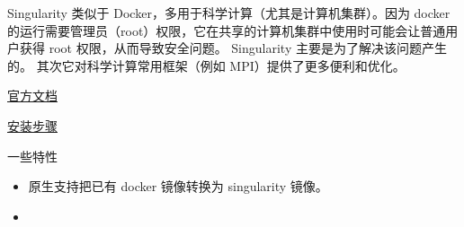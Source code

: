 
\begin{issues}
\issueDraft
\end{issues}

Singularity 类似于 Docker，多用于科学计算（尤其是计算机集群）。因为 docker 的运行需要管理员（root）权限，它在共享的计算机集群中使用时可能会让普通用户获得 root 权限，从而导致安全问题。 Singularity 主要是为了解决该问题产生的。 其次它对科学计算常用框架（例如 MPI）提供了更多便利和优化。

\href{https://docs.sylabs.io/guides/3.0/user-guide/index.html}{官方文档}

\href{https://docs.sylabs.io/guides/3.0/user-guide/quick_start.html#quick-installation-steps}{安装步骤}

一些特性
\begin{itemize}
\item 原生支持把已有 docker 镜像转换为 singularity 镜像。
\end{itemize}

\begin{itemize}
\item 
\end{itemize}
